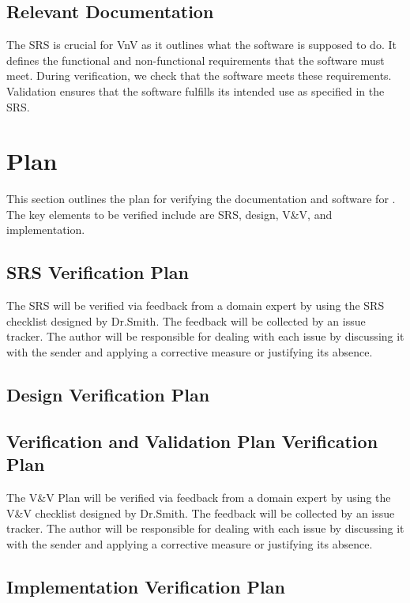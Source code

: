 \documentclass[12pt, titlepage]{article}
\begin{document}
\subsection{Relevant Documentation}

The SRS is crucial for VnV as it outlines what the software is supposed to do. It defines the functional and non-functional requirements that the software must meet.
During verification, we check that the software meets these requirements. Validation ensures that the software fulfills its intended use as specified in the SRS.

\citet{SRS}


\section{Plan}

This section outlines the plan for verifying the documentation and software for \progname. 
The key elements to be verified include are SRS, design, V\&V, and implementation.

\subsection{SRS Verification Plan}

The SRS \citet{SRS} will be verified via feedback from a domain expert by using the SRS checklist designed by Dr.Smith. The feedback will be collected by an issue tracker.
The author will be responsible for dealing with each issue by discussing it with the sender and applying a corrective measure or justifying its absence.

\subsection{Design Verification Plan}

\subsection{Verification and Validation Plan Verification Plan}

The V\&V Plan will be verified via feedback from a domain expert by using the V\&V checklist designed by Dr.Smith. The feedback will be collected by an issue tracker.
The author will be responsible for dealing with each issue by discussing it with the sender and applying a corrective measure or justifying its absence.

\subsection{Implementation Verification Plan}
\end{document}
